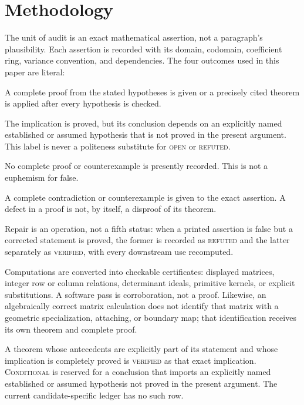 \section{Methodology}

The unit of audit is an exact mathematical assertion, not a paragraph's
plausibility.  Each assertion is recorded with its domain, codomain,
coefficient ring, variance convention, and dependencies.  The four outcomes
used in this paper are literal:

\begin{description}[leftmargin=8.2em,style=nextline]
\item[VERIFIED] A complete proof from the stated hypotheses is given or a
precisely cited theorem is applied after every hypothesis is checked.
\item[CONDITIONAL] The implication is proved, but its conclusion depends on
an explicitly named established or assumed hypothesis that is not proved in
the present argument.  This label is never a politeness substitute for
\textsc{open} or \textsc{refuted}.
\item[OPEN] No complete proof or counterexample is presently recorded.  This
is not a euphemism for false.
\item[REFUTED] A complete contradiction or counterexample is given to the
exact assertion.  A defect in a proof is not, by itself, a disproof of its
theorem.
\end{description}

Repair is an operation, not a fifth status: when a printed assertion is
false but a corrected statement is proved, the former is recorded as
\textsc{refuted} and the latter separately as \textsc{verified}, with every
downstream use recomputed.

Computations are converted into checkable certificates: displayed matrices,
integer row or column relations, determinant ideals, primitive kernels, or
explicit substitutions.  A software pass is corroboration, not a proof.
Likewise, an algebraically correct matrix calculation does not identify that
matrix with a geometric specialization, attaching, or boundary map; that
identification receives its own theorem and complete proof.

A theorem whose antecedents are explicitly part of its statement and whose
implication is completely proved is \textsc{verified} as that exact
implication.  \textsc{Conditional} is reserved for a conclusion that imports
an explicitly named established or assumed hypothesis not proved in the
present argument.  The current candidate-specific ledger has no such row.

